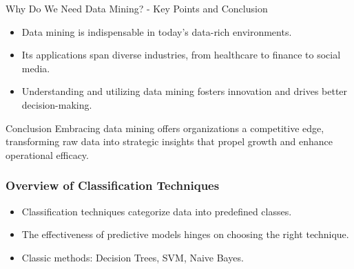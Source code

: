 \documentclass[aspectratio=169]{beamer}
\begin{document}
\begin{frame}[fragile]{Why Do We Need Data Mining? - Key Points and Conclusion}
    \begin{itemize}
        \item Data mining is indispensable in today's data-rich environments.
        \item Its applications span diverse industries, from healthcare to finance to social media.
        \item Understanding and utilizing data mining fosters innovation and drives better decision-making.
    \end{itemize}
    
    \begin{block}{Conclusion}
        Embracing data mining offers organizations a competitive edge, transforming raw data into strategic insights that propel growth and enhance operational efficacy.
    \end{block}
\end{frame}

\begin{frame}[fragile]
    \frametitle{Overview of Classification Techniques}
    \begin{itemize}
        \item Classification techniques categorize data into predefined classes.
        \item The effectiveness of predictive models hinges on choosing the right technique.
        \item Classic methods: Decision Trees, SVM, Naive Bayes.
    \end{itemize}
\end{frame}
\end{document}
